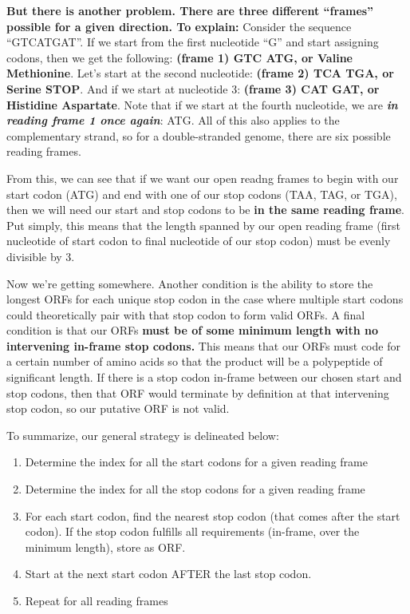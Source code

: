 \documentclass[
]{article}
\providecommand{\tightlist}{%
  \setlength{\itemsep}{0pt}\setlength{\parskip}{0pt}}
\begin{document}
\textbf{But there is another problem. There are three different
``frames'' possible for a given direction. To explain:} Consider the
sequence ``GTCATGAT''. If we start from the first nucleotide ``G'' and
start assigning codons, then we get the following: \textbf{(frame 1) GTC
ATG, or Valine Methionine}. Let's start at the second nucleotide:
\textbf{(frame 2) TCA TGA, or Serine STOP}. And if we start at
nucleotide 3: \textbf{(frame 3) CAT GAT, or Histidine Aspartate}. Note
that if we start at the fourth nucleotide, we are \textbf{\emph{in
reading frame 1 once again}}: ATG. All of this also applies to the
complementary strand, so for a double-stranded genome, there are six
possible reading frames.

From this, we can see that if we want our open readng frames to begin
with our start codon (ATG) and end with one of our stop codons (TAA,
TAG, or TGA), then we will need our start and stop codons to be
\textbf{in the same reading frame}. Put simply, this means that the
length spanned by our open reading frame (first nucleotide of start
codon to final nucleotide of our stop codon) must be evenly divisible by
3.

Now we're getting somewhere. Another condition is the ability to store
the longest ORFs for each unique stop codon in the case where multiple
start codons could theoretically pair with that stop codon to form valid
ORFs. A final condition is that our ORFs \textbf{must be of some minimum
length with no intervening in-frame stop codons.} This means that our
ORFs must code for a certain number of amino acids so that the product
will be a polypeptide of significant length. If there is a stop codon
in-frame between our chosen start and stop codons, then that ORF would
terminate by definition at that intervening stop codon, so our putative
ORF is not valid.

To summarize, our general strategy is delineated below:

\begin{enumerate}
\def\labelenumi{\arabic{enumi})}
\tightlist
\item
  Determine the index for all the start codons for a given reading frame
\item
  Determine the index for all the stop codons for a given reading frame
\item
  For each start codon, find the nearest stop codon (that comes after
  the start codon). If the stop codon fulfills all requirements
  (in-frame, over the minimum length), store as ORF.
\item
  Start at the next start codon AFTER the last stop codon.
\item
  Repeat for all reading frames
\end{enumerate}
\end{document}
